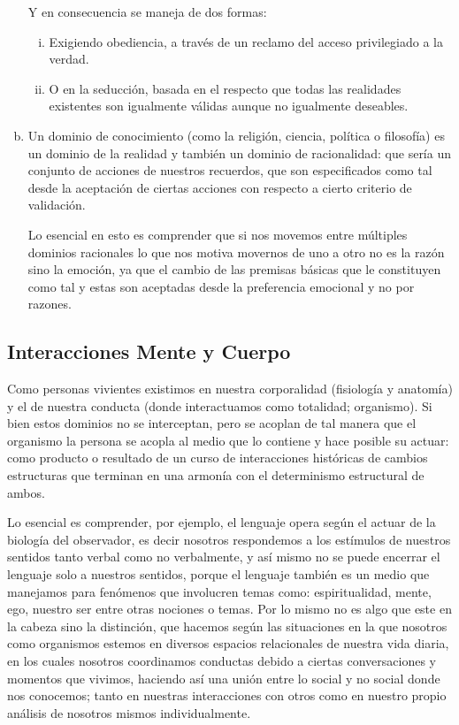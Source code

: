 \documentclass[10pt]{article}
\begin{document}
\begin{enumerate}[a)]
            Y en consecuencia se maneja de dos formas:

            \begin{enumerate}[i.]
                \item Exigiendo obediencia, a través de un reclamo del acceso privilegiado a la verdad.
                \item O en la seducción, basada en el respecto que todas las realidades existentes son igualmente válidas aunque no igualmente deseables.
            \end{enumerate}

            \item Un dominio de conocimiento (como la religión, ciencia, política o filosofía) es un dominio de la realidad y también un dominio de racionalidad: que sería un conjunto de acciones de nuestros recuerdos, que son especificados como tal desde la aceptación de ciertas acciones con respecto a cierto criterio de validación.
        
            Lo esencial en esto es comprender que si nos movemos entre múltiples dominios racionales lo que nos motiva movernos de uno a otro no es la razón sino la emoción, ya que el cambio de las premisas básicas que le constituyen como tal y estas son aceptadas desde la preferencia emocional y no por razones.
        \end{enumerate}
    

        \subsection{Interacciones Mente y Cuerpo}

        Como personas vivientes existimos en nuestra corporalidad (fisiología y anatomía) y el de nuestra conducta (donde interactuamos como totalidad; organismo). Si bien estos dominios no se interceptan, pero se acoplan de tal manera que el organismo la persona se acopla al medio que lo contiene y hace posible su actuar: como producto o resultado de un curso de interacciones históricas de cambios estructuras que terminan en una armonía con el determinismo estructural de ambos.
        
        Lo esencial es comprender, por ejemplo, el lenguaje opera según el actuar de la biología del observador, es decir nosotros respondemos a los estímulos de nuestros sentidos tanto verbal como no verbalmente, y así mismo no se puede encerrar el lenguaje solo a nuestros sentidos, porque el lenguaje también es un medio que manejamos para fenómenos que involucren temas como:  espiritualidad, mente, ego, nuestro ser entre otras nociones o temas. Por lo mismo no es algo que este en la cabeza sino la distinción, que hacemos según las situaciones en la que nosotros como organismos estemos  en diversos espacios relacionales de nuestra vida diaria, en los cuales nosotros coordinamos conductas debido a ciertas conversaciones y momentos que vivimos, haciendo así una unión entre lo social y no social donde nos conocemos; tanto en nuestras interacciones con otros como en nuestro propio análisis de nosotros mismos individualmente.
\end{document}
